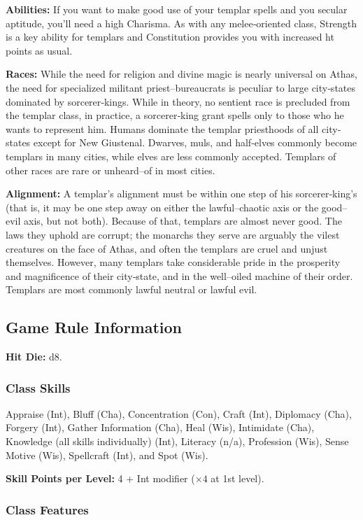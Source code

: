 \textbf{Abilities:} If you want to make good use of your templar spells and you secular aptitude, you'll need a high Charisma. As with any melee‐oriented class, Strength is a key ability for templars and Constitution provides you with increased ht points as usual.

\textbf{Races:} While the need for religion and divine magic is nearly universal on Athas, the need for specialized militant priest–bureaucrats is peculiar to large city‐states dominated by sorcerer‐kings. While in theory, no sentient race is precluded from the templar class, in practice, a sorcerer‐king grant spells only to those who he wants to represent him. Humans dominate the templar priesthoods of all city‐states except for New Giustenal. Dwarves, muls, and half‐elves commonly become templars in many cities, while elves are less commonly accepted. Templars of other races are rare or unheard–of in most cities.

\textbf{Alignment:} A templar's alignment must be within one step of his sorcerer‐king's (that is, it may be one step away on either the lawful–chaotic axis or the good–evil axis, but not both). Because of that, templars are almost never good. The laws they uphold are corrupt; the monarchs they serve are arguably the vilest creatures on the face of Athas, and often the templars are cruel and unjust themselves. However, many templars take considerable pride in the prosperity and magnificence of their city‐state, and in the well–oiled machine of their order. Templars are most commonly lawful neutral or lawful evil.

\subsection{Game Rule Information}

\textbf{Hit Die:} d8.

\subsubsection{Class Skills}
Appraise (Int), Bluff (Cha), Concentration (Con), Craft (Int), Diplomacy (Cha), Forgery (Int), Gather Information (Cha), Heal (Wis), Intimidate (Cha), Knowledge (all skills individually) (Int), Literacy (n/a), Profession (Wis), Sense Motive (Wis), Spellcraft (Int), and Spot (Wis).

\textbf{Skill Points per Level:} 4 + Int modifier ($\times 4$ at 1st level).

\subsubsection{Class Features}

